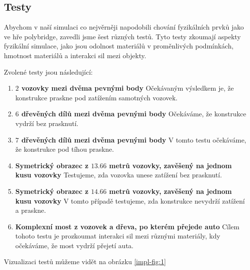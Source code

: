\subsection{Testy}

Abychom v naší simulaci co nejvěrněji napodobili chování fyzikálních prvků jako ve hře polybridge, zavedli jsme šest různých testů. Tyto testy zkoumají aspekty fyzikální simulace, jako jsou odolnost materiálů v proměnlivých podmínkách, hmotnost materiálů a interakci sil mezi objekty.

Zvolené testy jsou následující:

\begin{enumerate}
    \item \textbf{$2$ vozovky mezi dvěma pevnými body} Očekávaným výsledkem je, že konstrukce praskne pod zatížením samotných vozovek.
    \item \textbf{$6$ dřevěných dílů mezi dvěma pevnými body} Očekáváme, že konstrukce vydrží bez prasknutí.
    \item \textbf{$7$ dřevěných dílů mezi dvěma pevnými body} V tomto testu očekáváme, že konstrukce pod tíhou praskne.
    \item \textbf{Symetrický obrazec z $13.66$ metrů vozovky, zavěšený na jednom kusu vozovky} Testujeme, zda vozovka unese zatížení bez prasknutí.
    \item \textbf{Symetrický obrazec z $14.66$ metrů vozovky, zavěšený na jednom kusu vozovky} V tomto případě testujeme, zda konstrukce nevydrží zatížení a praskne.
    \item \textbf{Komplexní most z vozovek a dřeva, po kterém přejede auto} Cílem tohoto testu je prozkoumat interakci sil mezi různými materiály, kdy očekáváme, že most vydrží přejetí auta.
\end{enumerate}

Vizualizaci testů můžeme vidět na obrázku \ref{impl-fig:1}

